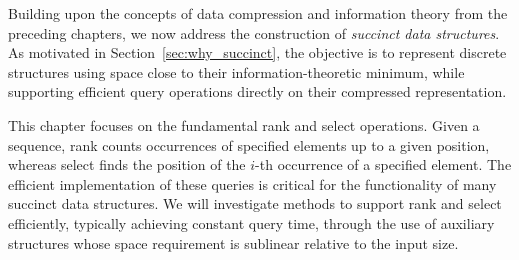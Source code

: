 

Building upon the concepts of data compression and information theory from the preceding chapters, we now address the construction of \emph{succinct data structures}. As motivated in Section~\ref{sec:why_succinct}, the objective is to represent discrete structures using space close to their information-theoretic minimum, while supporting efficient query operations directly on their compressed representation.

This chapter focuses on the fundamental \textsf{rank} and \textsf{select} operations. Given a sequence, \textsf{rank} counts occurrences of specified elements up to a given position, whereas \textsf{select} finds the position of the $i$-th occurrence of a specified element. The efficient implementation of these queries is critical for the functionality of many succinct data structures. We will investigate methods to support \textsf{rank} and \textsf{select} efficiently, typically achieving constant query time, through the use of auxiliary structures whose space requirement is sublinear relative to the input size.

